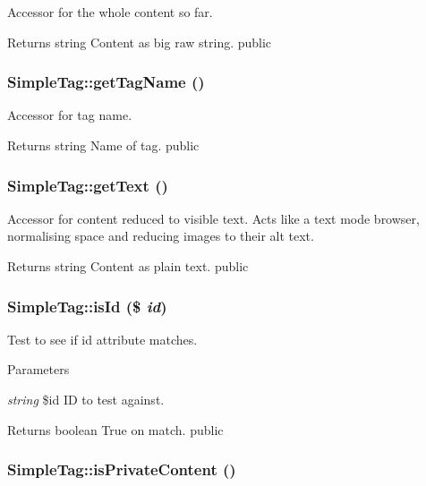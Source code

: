 \label{class_simple_tag_ab5e820ae55ae65b9accc7e72cbf1311b}
Accessor for the whole content so far. \begin{DoxyReturn}{Returns}
string Content as big raw string.  public 
\end{DoxyReturn}
\hypertarget{class_simple_tag_af7b4ef02cdcfdc986f3e05fdf7256e6c}{
\subsubsection[{getTagName}]{\setlength{\rightskip}{0pt plus 5cm}SimpleTag::getTagName ()}}
\label{class_simple_tag_af7b4ef02cdcfdc986f3e05fdf7256e6c}
Accessor for tag name. \begin{DoxyReturn}{Returns}
string Name of tag.  public 
\end{DoxyReturn}
\hypertarget{class_simple_tag_af1f897542b3aa323cd972b6719f550ee}{
\subsubsection[{getText}]{\setlength{\rightskip}{0pt plus 5cm}SimpleTag::getText ()}}
\label{class_simple_tag_af1f897542b3aa323cd972b6719f550ee}
Accessor for content reduced to visible text. Acts like a text mode browser, normalising space and reducing images to their alt text. \begin{DoxyReturn}{Returns}
string Content as plain text.  public 
\end{DoxyReturn}
\hypertarget{class_simple_tag_aac3fe7e35538c3e517ed886e932f5cef}{
\subsubsection[{isId}]{\setlength{\rightskip}{0pt plus 5cm}SimpleTag::isId (\$ {\em id})}}
\label{class_simple_tag_aac3fe7e35538c3e517ed886e932f5cef}
Test to see if id attribute matches. 
\begin{DoxyParams}{Parameters}
\item[{\em string}]\$id ID to test against. \end{DoxyParams}
\begin{DoxyReturn}{Returns}
boolean True on match.  public 
\end{DoxyReturn}
\hypertarget{class_simple_tag_a6f1d7a187565b366e995d94da0f16ad4}{
\subsubsection[{isPrivateContent}]{\setlength{\rightskip}{0pt plus 5cm}SimpleTag::isPrivateContent ()}}

